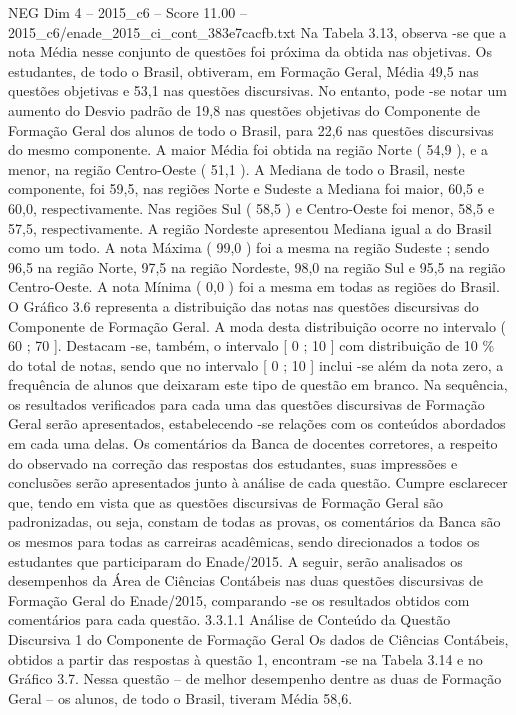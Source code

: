 \begin{textsample}{NEG Dim 4 – 2015\_c6 – Score 11.00 – 2015\_c6/enade\_2015\_ci\_cont\_383e7cacfb.txt}
Na Tabela 3.13, observa -se que a nota Média nesse conjunto de questões foi próxima da obtida nas objetivas.
Os estudantes, de todo o Brasil, obtiveram, em Formação Geral, Média 49,5 nas questões objetivas e 53,1 nas questões discursivas.
No entanto, pode -se notar um aumento do Desvio padrão de 19,8 nas questões objetivas do Componente de Formação Geral dos alunos de todo o Brasil, para 22,6 nas questões discursivas do mesmo componente.
A maior Média foi obtida na região Norte ( 54,9 ), e a menor, na região Centro-Oeste ( 51,1 ).
A Mediana de todo o Brasil, neste componente, foi 59,5, nas regiões Norte e Sudeste a Mediana foi maior, 60,5 e 60,0, respectivamente.
Nas regiões Sul ( 58,5 ) e Centro-Oeste foi menor, 58,5 e 57,5, respectivamente.
A região Nordeste apresentou Mediana igual a do Brasil como um todo.
A nota Máxima ( 99,0 ) foi a mesma na região Sudeste ; sendo 96,5 na região Norte, 97,5 na região Nordeste, 98,0 na região Sul e 95,5 na região Centro-Oeste.
A nota Mínima ( 0,0 ) foi a mesma em todas as regiões do Brasil.
O Gráfico 3.6 representa a distribuição das notas nas questões discursivas do Componente de Formação Geral.
A moda desta distribuição ocorre no intervalo ( 60 ; 70 ].
Destacam -se, também, o intervalo [ 0 ; 10 ] com distribuição de 10 \% do total de notas, sendo que no intervalo [ 0 ; 10 ] inclui -se além da nota zero, a frequência de alunos que deixaram este tipo de questão em branco.
Na sequência, os resultados verificados para cada uma das questões discursivas de Formação Geral serão apresentados, estabelecendo -se relações com os conteúdos abordados em cada uma delas.
Os comentários da Banca de docentes corretores, a respeito do observado na correção das respostas dos estudantes, suas impressões e conclusões serão apresentados junto à análise de cada questão.
Cumpre esclarecer que, tendo em vista que as questões discursivas de Formação Geral são padronizadas, ou seja, constam de todas as provas, os comentários da Banca são os mesmos para todas as carreiras acadêmicas, sendo direcionados a todos os estudantes que participaram do Enade/2015.
A seguir, serão analisados os desempenhos da Área de Ciências Contábeis nas duas questões discursivas de Formação Geral do Enade/2015, comparando -se os resultados obtidos com comentários para cada questão. 3.3.1.1 Análise de Conteúdo da Questão Discursiva 1 do Componente de Formação Geral Os dados de Ciências Contábeis, obtidos a partir das respostas à questão 1, encontram -se na Tabela 3.14 e no Gráfico 3.7.
Nessa questão – de melhor desempenho dentre as duas de Formação Geral – os alunos, de todo o Brasil, tiveram Média 58,6.

\end{textsample}
